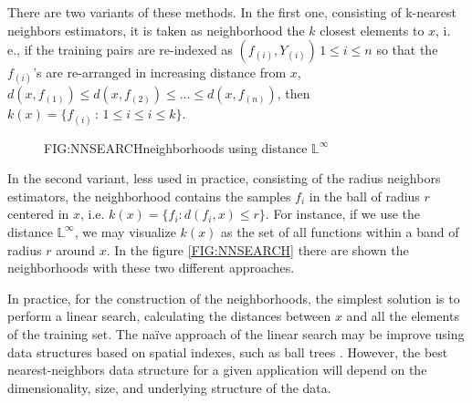 There are two variants of these methods. In the first one, consisting of
k-nearest neighbors estimators, it is taken as neighborhood the $k$ closest
elements to $x$, i. e., if the training pairs are re-indexed as
$(f_{(i)}, Y_{(i)}) \, 1\le i\le n$ so that the
$f_{(i)}$'s are re-arranged in increasing distance from $x$,
$d(x, f_{(1)}) \le d(x, f_{(2)}) \le \dots \le d(x, f_{(n)})$,
 then $k(x) = \{f_{(i)} \, : \, 1 \le i \le i\le k\}$.

\begin{figure}[Neighborhoods using distance $\mathbb{L}^\infty$]{FIG:NNSEARCH}{neighborhoods using distance $\mathbb{L}^\infty$}
	 \quad
\end{figure}

In the second variant, less used in practice, consisting of the radius neighbors
estimators, the neighborhood contains the samples $f_i$ in the ball of
radius $r$ centered in $x$, i.e.
$k(x) = \{ f_i : d(f_i , x) \le r\}$. For instance, if we
use the distance $\mathbb{L}^\infty$, we may visualize $k(x)$ as the set of all
functions within a band  of radius $r$ around $x$.
In the figure \ref{FIG:NNSEARCH} there are shown the neighborhoods with these two different
approaches.

In practice, for the construction of the neighborhoods, the simplest solution is
 to perform a linear search, calculating the distances between $x$ and all the
 elements of the training set.
The naïve approach of the linear search may be improve using data structures
based on spatial indexes, such as ball trees \cite{Kumar2008}. However, the best
nearest-neighbors data structure for a given application will depend on the
dimensionality, size, and underlying structure of the data.
